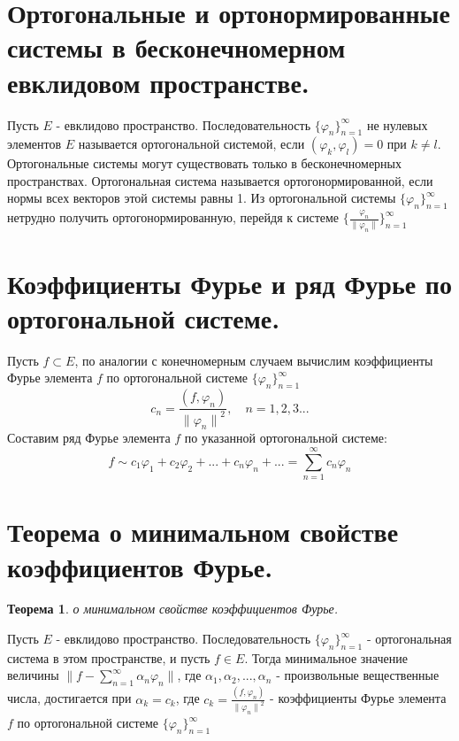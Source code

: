 \documentclass[12pt, a4paper]{article}
\newtheorem{thm}{Теорема}
\begin{document}
\section{Ортогональные и ортонормированные системы в бесконечномерном евклидовом пространстве.}
Пусть $E$ - евклидово пространство. Последовательность $\{\varphi_n\}_{n=1}^{\infty}$
не нулевых элементов $E$ называется ортогональной системой, если
$(\varphi_k, \varphi_l) = 0$ при $k \ne l$. Ортогональные системы могут существовать
только в бесконечномерных пространствах. Ортогональная система называется
ортогонормированной, если нормы всех векторов этой системы равны 1. Из
ортогональной системы $\{\varphi_n\}_{n=1}^{\infty}$ нетрудно получить
ортогонормированную, перейдя к системе $\{\frac{\varphi_n}{\| \varphi_n \|}\}_{n=1}^{\infty}$

\section{Коэффициенты Фурье и ряд Фурье по ортогональной системе.}
Пусть $f \subset E$, по аналогии с конечномерным случаем вычислим коэффициенты
Фурье элемента $f$ по ортогональной системе $\{\varphi_n\}_{n=1}^{\infty}$
$$c_n = \frac{(f, \varphi_n)}{{\| \varphi_n \|}^2}, \quad n=1,2,3 ...$$
Составим ряд Фурье элемента $f$ по указанной ортогональной системе:
$$ f \sim c_1 \varphi_1 + c_2 \varphi_2 + ... + c_n \varphi_n + ... =
\sum\limits_{n=1}^{\infty}c_n \varphi_n$$

\section{Теорема о минимальном свойстве коэффициентов Фурье.}
\begin{thm}
    о минимальном свойстве коэффициентов Фурье.
\end{thm}
Пусть $E$ - евклидово пространство. Последовательность $\{\varphi_n\}_{n=1}^{\infty}$
- ортогональная система в этом пространстве, и пусть $f \in E$.
Тогда минимальное значение величины $\| f - \sum\limits_{n=1}^{\infty}\alpha_n \varphi_n\|$,
где $\alpha_1, \alpha_2, ... , \alpha_n$ - произвольные вещественные
числа, достигается при $\alpha_k = c_k$, где $c_k = \frac{(f, \varphi_n)}{{\| \varphi_n \|}^2}$
- коэффициенты Фурье элемента $f$ по ортогональной системе $\{\varphi_n\}_{n=1}^{\infty}$
\end{document}
